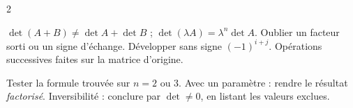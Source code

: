 \documentclass[a4paper,10pt]{article}
\begin{document}
\begin{multicols}{2}
\begin{PIEGE}
$\det(A+B)\neq\det A+\det B$ ; $\det(\lambda A)=\lambda^n\det A$. Oublier un facteur sorti ou un signe d'échange.
Développer sans signe $(-1)^{i+j}$. Opérations successives faites sur la matrice d'origine.
\end{PIEGE}

\begin{REFL}
Tester la formule trouvée sur $n=2$ ou $3$. Avec un paramètre : rendre le résultat \emph{factorisé}. Inversibilité :
conclure par $\det\neq0$, en listant les valeurs exclues.
\end{REFL}

\end{multicols}
\end{document}
